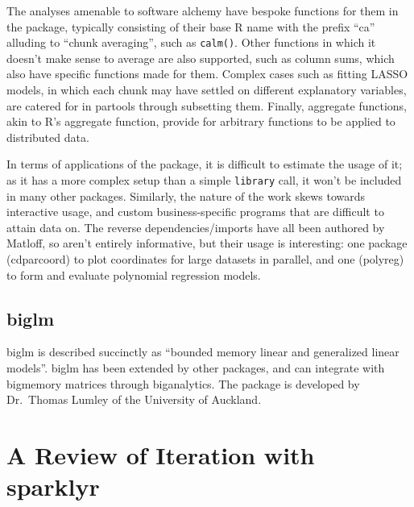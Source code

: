 \documentclass[a4paper,10pt]{article}
\begin{document}
The analyses amenable to software alchemy have bespoke functions for
them in the package, typically consisting of their base R name with
the prefix ``ca'' alluding to ``chunk averaging'', such as
\texttt{calm()}. Other functions in which it doesn't make sense to
average are also supported, such as column sums, which also have
specific functions made for them. Complex cases such as fitting LASSO
models, in which each chunk may have settled on different explanatory
variables, are catered for in partools through subsetting them.
Finally, aggregate functions, akin to R's aggregate function, provide
for arbitrary functions to be applied to distributed data.

In terms of applications of the package, it is difficult to estimate
the usage of it; as it has a more complex setup than a simple
\texttt{library} call, it won't be included in many other packages.
Similarly, the nature of the work skews towards interactive usage, and
custom business-specific programs that are difficult to attain data
on. The reverse dependencies/imports have all been authored by
Matloff, so aren't entirely informative, but their usage is
interesting: one package (cdparcoord) to plot coordinates for large
datasets in parallel, and one (polyreg) to form and evaluate
polynomial regression models.

\subsection{biglm}
\label{sec:biglm}

biglm is described succinctly as \enquote{bounded memory linear and
	generalized linear models}\cite{lumley13}. biglm has been extended
by other packages, and can integrate with bigmemory matrices through
biganalytics. The package is developed by Dr.~Thomas Lumley of the
University of Auckland.


\section{A Review of Iteration with sparklyr}
\end{document}
